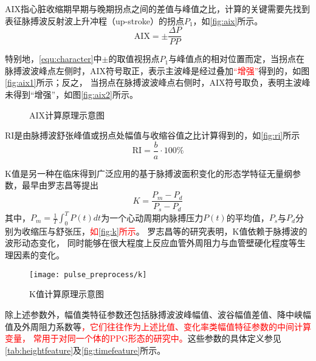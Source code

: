 AIX指心脏收缩期早期与晚期拐点之间的差值与峰值之比，计算的关键需要先找到表征脉搏波反射波上升冲程（up-stroke）的拐点$P_1$，如\autoref{fig:aix}所示\cite{Su2014}。
\begin{equation}
    \label{equ:aix}
    \text{AIX} = \pm \frac{\Delta P}{PP}
\end{equation}

特别地，\autoref{equ:character}中$\pm$的取值视拐点$P_1$与峰值点的相对位置而定，当拐点在脉搏波波峰点左侧时，AIX符号取正，表示主波峰是经过叠加\textcolor{red}{“增强”}得到的，如图\autoref{fig:aix1}所示；反之，
当拐点在脉搏波波峰点右侧时，AIX符号取负，表明主波峰未得到“增强”，如图\autoref{fig:aix2}所示。
\begin{figure}[htbp]
    \centering
    \quad
    \caption[AIX计算原理示意图]{\label{fig:aix}AIX计算原理示意图\cite{Su2014}}
\end{figure}

RI是由脉搏波舒张峰值或拐点处幅值与收缩谷值之比计算得到的，如\autoref{fig:ri}所示\cite{Su2014,Elgendi2012}
\begin{equation}
    \label{equ:ri}
    \text{RI} = \frac{b}{a} \cdot 100\%
\end{equation}

K值是另一种在临床得到广泛应用的基于脉搏波面积变化的形态学特征无量纲参数，最早由罗志昌等\cite{Luo1988,PPGYY}提出
\begin{equation}
    \label{equ:ppgk}
    K=\frac{P_m-P_d}{P_s-P_d}
\end{equation}
其中，$P_m=\frac{1}{T}\int_{0}^{T}P(t)dt$为一个心动周期内脉搏压力$P(t)$的平均值，$P_s$与$P_d$分别为收缩压与舒张压，\textcolor{red}{如\autoref{fig:k}所示}。
罗志昌等\cite{Luo1988,PPGYY}的研究表明，K值依赖于脉搏波的波形动态变化，
同时能够在很大程度上反应血管外周阻力与血管壁硬化程度等生理因素的变化。
\begin{figure}[htbp]
    \centering
    \texttt{[image: pulse\_preprocess/k]}
    \caption{\label{fig:k}K值计算原理示意图}
\end{figure}

除上述参数外，幅值类特征参数还包括脉搏波波峰幅值、波谷幅值差值、降中峡幅值及外周阻力系数等\textcolor{red}{，它们往往作为上述比值、变化率类幅值特征参数的中间计算变量，
常用于对同一个体的PPG形态的研究中\cite{cwl,mmt}。}这些参数的具体定义参见\autoref{tab:heightfeature}及\autoref{fig:timefeature}所示。

